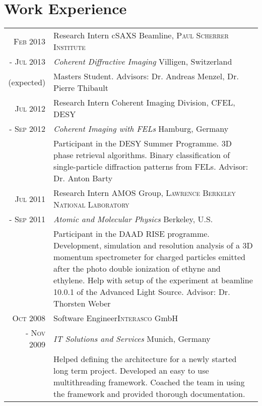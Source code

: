 \documentclass[a4paper,10pt]{article}
\begin{document}
\section{Work Experience}
\begin{tabularx}{19cm}{rX}

 \textsc{Feb 2013} & Research Intern \hfill cSAXS Beamline, \textsc{Paul Scherrer Institute}\\
\textsc{- Jul 2013} &\emph{Coherent Diffractive Imaging} \hfill Villigen, Switzerland\\
(expected)&\footnotesize{Masters Student. Advisors: Dr. Andreas Menzel, Dr. Pierre Thibault}\vspace{2mm}\\ 

 \textsc{Jul 2012} & Research Intern \hfill Coherent Imaging Division, \textsc{CFEL, DESY}\\
\textsc{- Sep 2012} &\emph{Coherent Imaging with FELs} \hfill Hamburg, Germany\\
&\footnotesize{Participant in the DESY Summer Programme. 3D phase retrieval algorithms. Binary classification of single-particle diffraction patterns from FELs. Advisor: Dr. Anton Barty}\vspace{2mm}\\ 

 \textsc{Jul 2011} & Research Intern \hfill AMOS Group, \textsc{Lawrence Berkeley National Laboratory}\\
\textsc{- Sep 2011} &\emph{Atomic and Molecular Physics} \hfill Berkeley, U.S.\\
&\footnotesize{Participant in the DAAD RISE programme. Development, simulation and resolution analysis of a 3D momentum spectrometer for charged particles emitted
after the photo double ionization of ethyne and ethylene. Help with setup of the experiment at beamline 10.0.1 of
the Advanced Light Source. Advisor: Dr. Thorsten Weber}\vspace{2mm}\\ 

 \textsc{Oct 2008} & Software Engineer\hfill \textsc{Interasco} GmbH
 \\\textsc{- Nov 2009}&\emph{IT Solutions and Services} \hfill Munich, Germany\\&\footnotesize{Helped defining the architecture for a newly started long term project. Developed an easy to use multithreading framework. Coached the team in using the framework and provided thorough documentation.}\vspace{2mm}\\ 


\end{tabularx}
\end{document}
